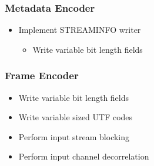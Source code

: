 \documentclass[12pt]{scrartcl}
\begin{document}
  \subsubsection{Metadata Encoder}
  \begin{itemize}
  \item Implement STREAMINFO writer
    \begin{itemize}
    \item Write variable bit length fields
    \end{itemize}
  \end{itemize}
  
  \subsubsection{Frame Encoder}
  \begin{itemize}
  \item Write variable bit length fields
  \item Write variable sized UTF codes
  \item Perform input stream blocking
  \item Perform input channel decorrelation
  \end{itemize}
  
\end{document}
